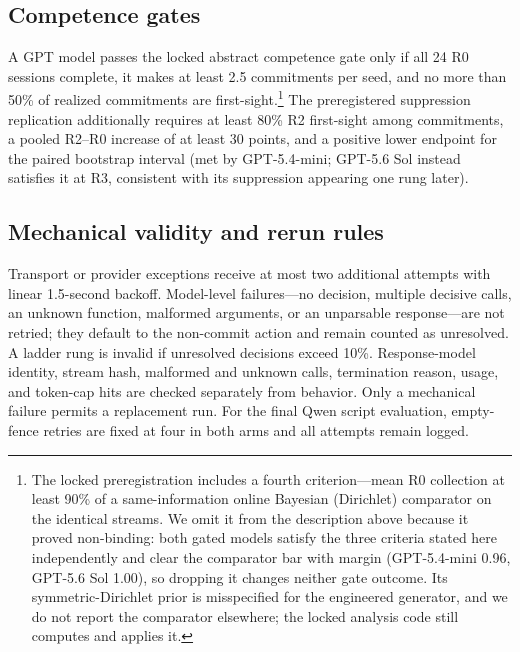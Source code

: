 \documentclass{article}
\begin{document}
\subsection{Competence gates}

A GPT model passes the locked abstract competence gate only if all 24 R0 sessions complete, it makes at least 2.5 commitments per seed, and no more than 50\% of realized commitments are first-sight.\footnote{The locked preregistration includes a fourth criterion---mean R0 collection at least 90\% of a same-information online Bayesian (Dirichlet) comparator on the identical streams. We omit it from the description above because it proved non-binding: both gated models satisfy the three criteria stated here independently and clear the comparator bar with margin (GPT-5.4-mini 0.96, GPT-5.6 Sol 1.00), so dropping it changes neither gate outcome. Its symmetric-Dirichlet prior is misspecified for the engineered generator, and we do not report the comparator elsewhere; the locked analysis code still computes and applies it.} The preregistered suppression replication additionally requires at least 80\% R2 first-sight among commitments, a pooled R2--R0 increase of at least 30 points, and a positive lower endpoint for the paired bootstrap interval (met by GPT-5.4-mini; GPT-5.6 Sol instead satisfies it at R3, consistent with its suppression appearing one rung later).

\subsection{Mechanical validity and rerun rules} \label{app:mech-validity}

Transport or provider exceptions receive at most two additional attempts with linear 1.5-second backoff. Model-level failures---no decision, multiple decisive calls, an unknown function, malformed arguments, or an unparsable response---are not retried; they default to the non-commit action and remain counted as unresolved. A ladder rung is invalid if unresolved decisions exceed 10\%. Response-model identity, stream hash, malformed and unknown calls, termination reason, usage, and token-cap hits are checked separately from behavior. Only a mechanical failure permits a replacement run. For the final Qwen script evaluation, empty-fence retries are fixed at four in both arms and all attempts remain logged.
\end{document}
